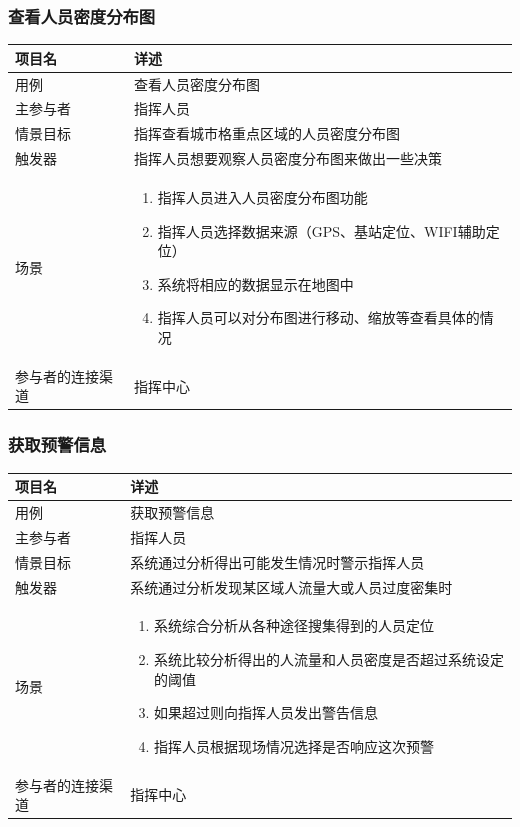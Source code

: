 \documentclass{ctexrep}
\begin{document}
\subsubsection{查看人员密度分布图}
\begin{longtable}{p{2cm} | p{10cm}}
\hline
项目名 & 详述 \\
\hline
\hline
用例 & 查看人员密度分布图\\
\hline
主参与者 & 指挥人员 \\
\hline
情景目标 &  指挥查看城市格重点区域的人员密度分布图\\
\hline
触发器 &  指挥人员想要观察人员密度分布图来做出一些决策\\
\hline
场景 & \begin{enumerate}
	\item 指挥人员进入人员密度分布图功能
	\item 指挥人员选择数据来源（GPS、基站定位、WIFI辅助定位）
	\item 系统将相应的数据显示在地图中
	\item 指挥人员可以对分布图进行移动、缩放等查看具体的情况
\end{enumerate} \\
\hline
参与者的连接渠道 & 指挥中心 \\
\hline
\end{longtable}

\subsubsection{获取预警信息}
\begin{longtable}{p{2cm} | p{10cm}}
\hline
项目名 & 详述 \\
\hline
\hline
用例 & 获取预警信息\\
\hline
主参与者 & 指挥人员 \\
\hline
情景目标 &  系统通过分析得出可能发生情况时警示指挥人员\\
\hline
触发器 &  系统通过分析发现某区域人流量大或人员过度密集时\\
\hline
场景 & \begin{enumerate}
	\item 系统综合分析从各种途径搜集得到的人员定位
	\item 系统比较分析得出的人流量和人员密度是否超过系统设定的阈值
	\item 如果超过则向指挥人员发出警告信息
	\item 指挥人员根据现场情况选择是否响应这次预警
\end{enumerate} \\
\hline
参与者的连接渠道 & 指挥中心 \\
\hline
\end{longtable}
\end{document}
